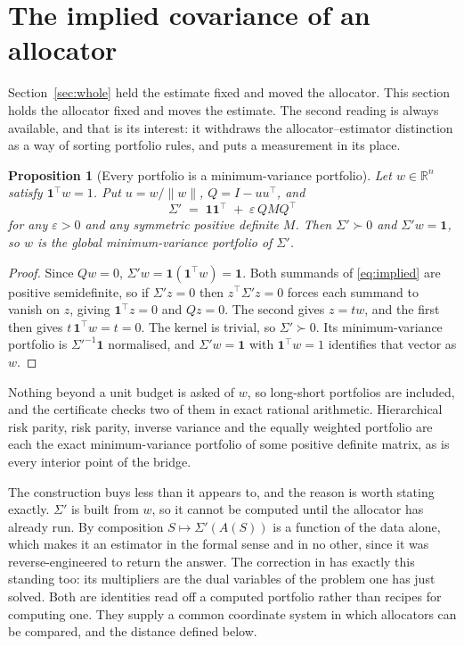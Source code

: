 \documentclass[11pt]{article}
\newtheorem{proposition}{Proposition}
\theoremstyle{remark}
\begin{document}
\section{The implied covariance of an allocator}
\label{sec:implied}

Section~\ref{sec:whole} held the estimate fixed and moved the allocator.
This section holds the allocator fixed and moves the estimate. The second
reading is always available, and that is its interest: it withdraws the
allocator--estimator distinction as a way of sorting portfolio rules, and
puts a measurement in its place.

\begin{proposition}[Every portfolio is a minimum-variance portfolio]
\label{prop:implied}
Let $w \in \mathbb{R}^n$ satisfy $\mathbf{1}^\top w = 1$. Put $u = w/\|w\|$,
$Q = I - uu^\top$, and
\begin{equation}
\Sigma' \;=\; \mathbf{1}\mathbf{1}^\top \;+\; \varepsilon\, Q M Q^\top
\label{eq:implied}
\end{equation}
for any $\varepsilon > 0$ and any symmetric positive definite $M$. Then
$\Sigma' \succ 0$ and $\Sigma' w = \mathbf{1}$, so $w$ is the global
minimum-variance portfolio of $\Sigma'$.
\end{proposition}

\begin{proof}
Since $Qw = 0$, $\Sigma' w = \mathbf{1}(\mathbf{1}^\top w) = \mathbf{1}$.
Both summands of \eqref{eq:implied} are positive semidefinite, so if
$\Sigma' z = 0$ then $z^\top \Sigma' z = 0$ forces each summand to vanish on
$z$, giving $\mathbf{1}^\top z = 0$ and $Qz = 0$. The second gives $z = tw$,
and the first then gives $t\,\mathbf{1}^\top w = t = 0$. The kernel is
trivial, so $\Sigma' \succ 0$. Its minimum-variance portfolio is
$\Sigma'^{-1}\mathbf{1}$ normalised, and $\Sigma' w = \mathbf{1}$ with
$\mathbf{1}^\top w = 1$ identifies that vector as $w$.
\end{proof}

Nothing beyond a unit budget is asked of $w$, so long-short portfolios are
included, and the certificate checks two of them in exact rational
arithmetic. Hierarchical risk parity, risk parity, inverse variance
and the equally weighted portfolio are each the exact minimum-variance
portfolio of some positive definite matrix, as is every interior point of
the bridge.

The construction buys less than it appears to, and the reason is worth
stating exactly. $\Sigma'$ is built from $w$, so it cannot be computed until
the allocator has already run. By composition $S \mapsto \Sigma'(A(S))$ is a
function of the data alone, which makes it an estimator in the formal sense
and in no other, since it was reverse-engineered to return the answer. The
correction in \cite{jagannathanma2003} has exactly this standing too: its
multipliers are the dual variables of the problem one has just solved. Both
are identities read off a computed portfolio rather than recipes for
computing one. They supply a common coordinate system in which
allocators can be compared, and the distance defined below.
\end{document}
